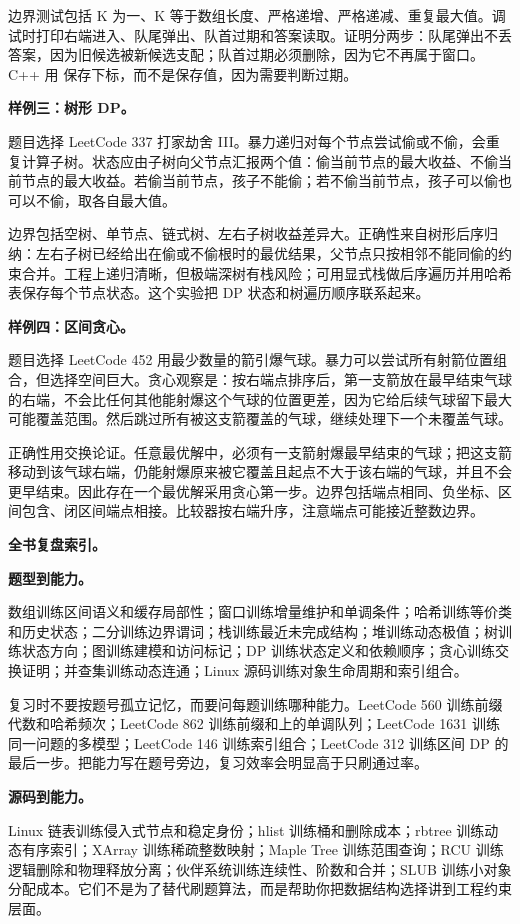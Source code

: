 边界测试包括 K 为一、K 等于数组长度、严格递增、严格递减、重复最大值。调试时打印右端进入、队尾弹出、队首过期和答案读取。证明分两步：队尾弹出不丢答案，因为旧候选被新候选支配；队首过期必须删除，因为它不再属于窗口。C++ 用  保存下标，而不是保存值，因为需要判断过期。

\noindent\textbf{样例三：树形 DP。}

题目选择 LeetCode 337 打家劫舍 III。暴力递归对每个节点尝试偷或不偷，会重复计算子树。状态应由子树向父节点汇报两个值：偷当前节点的最大收益、不偷当前节点的最大收益。若偷当前节点，孩子不能偷；若不偷当前节点，孩子可以偷也可以不偷，取各自最大值。

边界包括空树、单节点、链式树、左右子树收益差异大。正确性来自树形后序归纳：左右子树已经给出在偷或不偷根时的最优结果，父节点只按相邻不能同偷的约束合并。工程上递归清晰，但极端深树有栈风险；可用显式栈做后序遍历并用哈希表保存每个节点状态。这个实验把 DP 状态和树遍历顺序联系起来。

\noindent\textbf{样例四：区间贪心。}

题目选择 LeetCode 452 用最少数量的箭引爆气球。暴力可以尝试所有射箭位置组合，但选择空间巨大。贪心观察是：按右端点排序后，第一支箭放在最早结束气球的右端，不会比任何其他能射爆这个气球的位置更差，因为它给后续气球留下最大可能覆盖范围。然后跳过所有被这支箭覆盖的气球，继续处理下一个未覆盖气球。

正确性用交换论证。任意最优解中，必须有一支箭射爆最早结束的气球；把这支箭移动到该气球右端，仍能射爆原来被它覆盖且起点不大于该右端的气球，并且不会更早结束。因此存在一个最优解采用贪心第一步。边界包括端点相同、负坐标、区间包含、闭区间端点相接。比较器按右端升序，注意端点可能接近整数边界。

\noindent\textbf{全书复盘索引。}

\noindent\textbf{题型到能力。}

数组训练区间语义和缓存局部性；窗口训练增量维护和单调条件；哈希训练等价类和历史状态；二分训练边界谓词；栈训练最近未完成结构；堆训练动态极值；树训练状态方向；图训练建模和访问标记；DP 训练状态定义和依赖顺序；贪心训练交换证明；并查集训练动态连通；Linux 源码训练对象生命周期和索引组合。

复习时不要按题号孤立记忆，而要问每题训练哪种能力。LeetCode 560 训练前缀代数和哈希频次；LeetCode 862 训练前缀和上的单调队列；LeetCode 1631 训练同一问题的多模型；LeetCode 146 训练索引组合；LeetCode 312 训练区间 DP 的最后一步。把能力写在题号旁边，复习效率会明显高于只刷通过率。

\noindent\textbf{源码到能力。}

Linux 链表训练侵入式节点和稳定身份；hlist 训练桶和删除成本；rbtree 训练动态有序索引；XArray 训练稀疏整数映射；Maple Tree 训练范围查询；RCU 训练逻辑删除和物理释放分离；伙伴系统训练连续性、阶数和合并；SLUB 训练小对象分配成本。它们不是为了替代刷题算法，而是帮助你把数据结构选择讲到工程约束层面。

